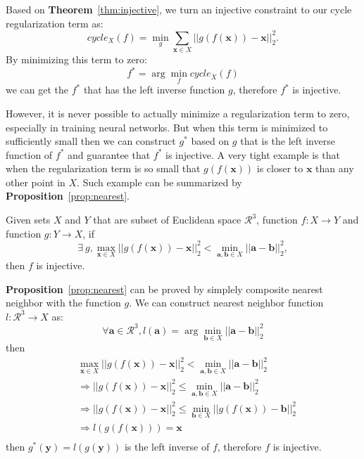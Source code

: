Based on \textbf{Theorem}~\ref{thm:injective}, we turn an injective constraint to our cycle regularization term as:
\begin{equation}
\label{equ:cycle_term}
cycle_X(f)=\min_g\sum_{\mathbf{x}\in X}||g(f(\mathbf{x})) - \mathbf{x}||_2^2.
\end{equation}
By minimizing this term to zero:
\begin{equation}
f^* = \arg\min_f cycle_X(f)
\end{equation}
we can get the $f^*$ that has the left inverse function $g$, therefore $f^*$ is injective. 

However, it is never possible to actually minimize a regularization term to zero, especially in training neural networks. But when this term is minimized to sufficiently small then we can construct $g^*$ based on $g$ that is the left inverse function of $f^*$ and guarantee that $f^*$ is injective. A very tight example is that when the regularization term is so small that $g(f(\mathbf{x}))$ is closer to $\mathbf{x}$ than any other point in $X$. Such example can be summarized by \textbf{Proposition}~\ref{prop:nearest}.

\begin{m_prop}
	\label{prop:nearest}
	Given sets $X$ and $Y$ that are subset of Euclidean space $\mathcal{R}^3$, function $f:X \rightarrow Y$  and function $g:Y \rightarrow X$, if
	\begin{equation}
	\exists~g, \max_{\mathbf{x}\in X}|| g(f(\mathbf{x})) - \mathbf{x} ||_2^2 < \min_{\mathbf{a},\mathbf{b} \in X}|| \mathbf{a} - \mathbf{b} ||_2^2,
	\end{equation}
	then $f$ is injective.
\end{m_prop}

\textbf{Proposition}~\ref{prop:nearest} can be proved by simplely composite nearest neighbor with the function $g$. We can construct nearest neighbor function $l: \mathcal{R}^3 \rightarrow X $ as:
\begin{equation}
\forall \mathbf{a} \in \mathcal{R}^3, l(\mathbf{a}) = \arg\min_{\mathbf{b} \in X} || \mathbf{a} - \mathbf{b} ||_2^2
\end{equation}
then
\begin{equation}
\begin{aligned}
&\max_{\mathbf{x}\in X}|| g(f(\mathbf{x})) - \mathbf{x} ||_2^2 < \min_{\mathbf{a},\mathbf{b} \in X}|| \mathbf{a} - \mathbf{b} ||_2^2\\
&\Rightarrow || g(f(\mathbf{x})) - \mathbf{x} ||_2^2 \leq \min_{\mathbf{a},\mathbf{b} \in X}|| \mathbf{a} - \mathbf{b} ||_2^2\\
&\Rightarrow || g(f(\mathbf{x})) - \mathbf{x} ||_2^2 \leq \min_{\mathbf{b} \in X}|| g(f(\mathbf{x})) - \mathbf{b} ||_2^2\\
&\Rightarrow l(g(f(\mathbf{x}))) = \mathbf{x}\\
\end{aligned}
\end{equation}
then $g^*(\mathbf{y}) = l(g(\mathbf{y}))$ is the left inverse of $f$, therefore $f$ is injective.

